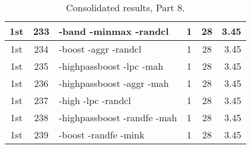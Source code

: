 \begin{table}
\begin{minipage}[b]{\textwidth}
\begin{tabular}{|c|c|l|c|c|r|}
1st & 233 & -band -minmax -randcl  & 1 & 28 & 3.45\\ \hline
1st & 234 & -boost -aggr -randcl  & 1 & 28 & 3.45\\ \hline
1st & 235 & -highpassboost -lpc -mah  & 1 & 28 & 3.45\\ \hline
1st & 236 & -highpassboost -aggr -mah  & 1 & 28 & 3.45\\ \hline
1st & 237 & -high -lpc -randcl  & 1 & 28 & 3.45\\ \hline
1st & 238 & -highpassboost -randfe -mah  & 1 & 28 & 3.45\\ \hline
1st & 239 & -boost -randfe -mink  & 1 & 28 & 3.45\\ \hline
\end{tabular}
\end{minipage}
\caption{Consolidated results, Part 8.}
\label{tab:results8}
\end{table}

